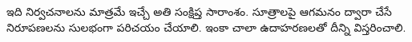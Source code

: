 \documentclass[../../../include/open-logic-chapter]{subfiles}
\begin{document}

\begin{editorial}
  ఇది నిర్వచనాలను మాత్రమే ఇచ్చే అతి సంక్షిప్త సారాంశం. సూత్రాలపై ఆగమనం ద్వారా
  చేసే నిరూపణలను సులభంగా పరిచయం చేయాలి. ఇంకా చాలా ఉదాహరణలతో దీన్ని
  విస్తరించాలి.
\end{editorial}







\OLEndChapterHook
\end{document}
